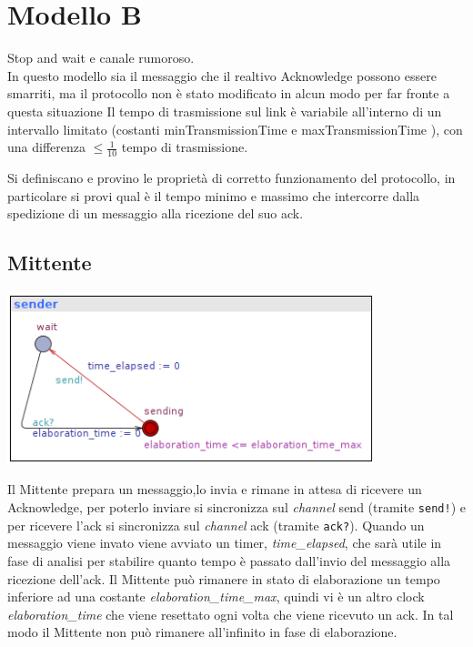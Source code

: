 \documentclass[a4paper]{article}
\newcommand{\channel}{\textit{channel }}
\begin{document}
\section{Modello B}
Stop and wait e canale rumoroso.\\ 
In questo modello sia il messaggio che il realtivo Acknowledge possono essere smarriti, ma il protocollo non è stato modificato in alcun modo per far fronte a questa situazione
Il tempo di trasmissione sul link è variabile all’interno di un intervallo limitato (costanti minTransmissionTime e maxTransmissionTime ), con una differenza $\leq \frac{1}{10}$ tempo di trasmissione. 

Si definiscano e provino le proprietà di corretto funzionamento del protocollo, in particolare si provi qual è il tempo minimo e massimo che intercorre dalla spedizione di un messaggio alla ricezione del suo ack.
\subsection{Mittente}
\begin{center}\includegraphics[width=0.8\textwidth]{1_sender.png}\end{center}
Il Mittente prepara un messaggio,lo invia e rimane in attesa di ricevere un Acknowledge, per poterlo inviare si sincronizza sul \channel send (tramite \texttt{send!}) e per ricevere l'ack si sincronizza sul \channel ack (tramite \texttt{ack?}).
Quando un messaggio viene invato viene avviato un timer, \textit{time\_elapsed}, che sarà utile in fase di analisi per stabilire quanto tempo è passato dall'invio del messaggio alla ricezione dell'ack.
Il Mittente può rimanere in stato di elaborazione un tempo inferiore ad una costante \textit{elaboration\_time\_max}, quindi vi è un altro clock \textit{elaboration\_time} che viene resettato ogni volta che viene ricevuto un ack.
In tal modo il Mittente non può rimanere all'infinito in fase di elaborazione.
\end{document}
